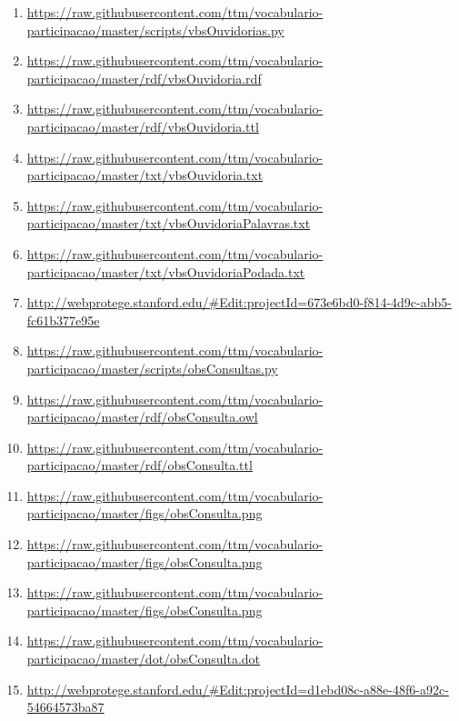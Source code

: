 \documentclass[12pt]{article}
\begin{document}
{\begin{enumerate}
    \item \url{https://raw.githubusercontent.com/ttm/vocabulario-participacao/master/scripts/vbsOuvidorias.py}\label{i:38}
    \item \url{https://raw.githubusercontent.com/ttm/vocabulario-participacao/master/rdf/vbsOuvidoria.rdf}\label{i:39}
    \item \url{https://raw.githubusercontent.com/ttm/vocabulario-participacao/master/rdf/vbsOuvidoria.ttl}\label{i:40}
    \item \url{https://raw.githubusercontent.com/ttm/vocabulario-participacao/master/txt/vbsOuvidoria.txt}\label{i:41}
    \item \url{https://raw.githubusercontent.com/ttm/vocabulario-participacao/master/txt/vbsOuvidoriaPalavras.txt}\label{i:42}
    \item \url{https://raw.githubusercontent.com/ttm/vocabulario-participacao/master/txt/vbsOuvidoriaPodada.txt}\label{i:43}
    \item \url{http://webprotege.stanford.edu/#Edit:projectId=673e6bd0-f814-4d9c-abb5-fc61b377e95e}\label{i:43wp}

 \item \url{https://raw.githubusercontent.com/ttm/vocabulario-participacao/master/scripts/obsConsultas.py}\label{i:44}
    \item  \url{https://raw.githubusercontent.com/ttm/vocabulario-participacao/master/rdf/obsConsulta.owl}\label{i:45}
    \item  \url{https://raw.githubusercontent.com/ttm/vocabulario-participacao/master/rdf/obsConsulta.ttl}\label{i:46}
    \item \url{https://raw.githubusercontent.com/ttm/vocabulario-participacao/master/figs/obsConsulta.png}\label{i:47}
    \item \url{https://raw.githubusercontent.com/ttm/vocabulario-participacao/master/figs/obsConsulta.png}\label{i:48}
    \item \url{https://raw.githubusercontent.com/ttm/vocabulario-participacao/master/figs/obsConsulta.png}\label{i:49}
    \item  \url{https://raw.githubusercontent.com/ttm/vocabulario-participacao/master/dot/obsConsulta.dot}\label{i:50}
    \item  \url{http://webprotege.stanford.edu/#Edit:projectId=d1ebd08c-a88e-48f6-a92c-54664573ba87}\label{i:50wp}


\end{enumerate}}
\end{document}
